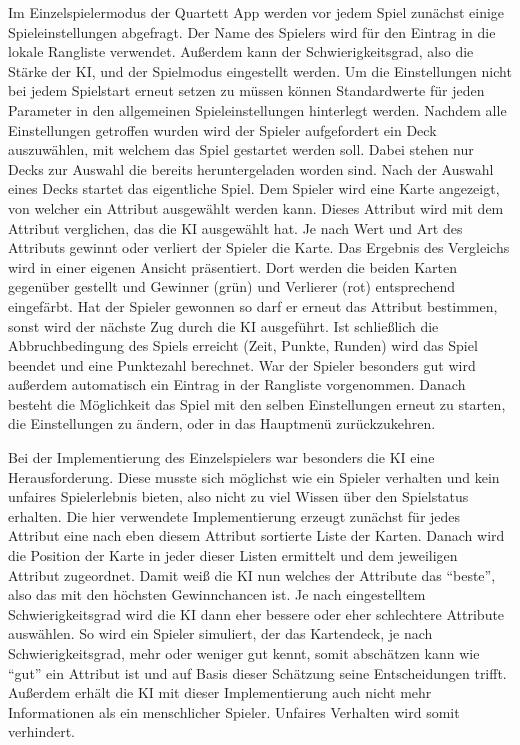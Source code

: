 \documentclass{scrartcl}
\begin{document}
\noindent
Im Einzelspielermodus der Quartett App werden vor jedem Spiel zunächst einige
Spieleinstellungen abgefragt. Der Name des Spielers wird für den Eintrag in die
lokale Rangliste verwendet. Außerdem kann der Schwierigkeitsgrad, also die
Stärke der KI, und der Spielmodus eingestellt werden. Um die Einstellungen nicht
bei jedem Spielstart erneut setzen zu müssen können Standardwerte für jeden
Parameter in den allgemeinen Spieleinstellungen hinterlegt werden. Nachdem alle
Einstellungen getroffen wurden wird der Spieler aufgefordert ein Deck
auszuwählen, mit welchem das Spiel gestartet werden soll. Dabei stehen nur Decks
zur Auswahl die bereits heruntergeladen worden sind. Nach der Auswahl eines
Decks startet das eigentliche Spiel. Dem Spieler wird eine Karte angezeigt, von
welcher ein Attribut ausgewählt werden kann. Dieses Attribut wird mit dem
Attribut verglichen, das die KI ausgewählt hat. Je nach Wert und Art des
Attributs gewinnt oder verliert der Spieler die Karte. Das Ergebnis des
Vergleichs wird in einer eigenen Ansicht präsentiert. Dort werden die beiden
Karten gegenüber gestellt und Gewinner (grün) und Verlierer (rot) entsprechend
eingefärbt. Hat der Spieler gewonnen so darf er erneut das Attribut bestimmen,
sonst wird der nächste Zug durch die KI ausgeführt. Ist schließlich die
Abbruchbedingung des Spiels erreicht (Zeit, Punkte, Runden) wird das Spiel
beendet und eine Punktezahl berechnet. War der Spieler besonders gut wird
außerdem automatisch ein Eintrag in der Rangliste vorgenommen. Danach besteht
die Möglichkeit das Spiel mit den selben Einstellungen erneut zu starten, die
Einstellungen zu ändern, oder in das Hauptmenü zurückzukehren.


\noindent
Bei der Implementierung des Einzelspielers war besonders die KI eine
Herausforderung. Diese musste sich möglichst wie ein Spieler verhalten und kein
unfaires Spielerlebnis bieten, also nicht zu viel Wissen über den Spielstatus
erhalten. Die hier verwendete Implementierung erzeugt zunächst für jedes
Attribut eine nach eben diesem Attribut sortierte Liste der Karten. Danach wird
die Position der Karte in jeder dieser Listen ermittelt und dem jeweiligen
Attribut zugeordnet. Damit weiß die KI nun welches der Attribute das
\enquote{beste}, also das mit den höchsten Gewinnchancen ist. Je nach
eingestelltem Schwierigkeitsgrad wird die KI dann eher bessere oder eher
schlechtere Attribute auswählen. So wird ein Spieler simuliert, der das
Kartendeck, je nach Schwierigkeitsgrad, mehr oder weniger gut kennt, somit
abschätzen kann wie \enquote{gut} ein Attribut ist und auf Basis dieser
Schätzung seine Entscheidungen trifft. Außerdem erhält die KI mit dieser
Implementierung auch nicht mehr Informationen als ein menschlicher Spieler.
Unfaires Verhalten wird somit verhindert.
\end{document}
